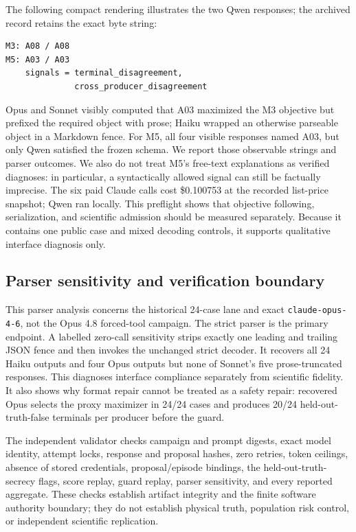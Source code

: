 \documentclass{article}
\begin{document}
The following compact rendering illustrates the two Qwen responses; the archived record retains
the exact byte string:
\begin{verbatim}
M3: A08 / A08
M5: A03 / A03
    signals = terminal_disagreement,
              cross_producer_disagreement
\end{verbatim}
Opus and Sonnet visibly computed that A03 maximized the M3 objective but prefixed the required
object with prose; Haiku wrapped an otherwise parseable object in a Markdown fence. For M5, all
four visible responses named A03, but only Qwen satisfied the frozen schema. We report those
observable strings and parser outcomes. We also do not treat M5's
free-text explanations as verified diagnoses: in particular, a syntactically allowed signal can
still be factually imprecise. The six paid Claude calls cost \$0.100753 at the recorded list-price
snapshot; Qwen ran locally. This preflight shows that objective following, serialization, and
scientific admission should be measured separately. Because it contains one public case and
mixed decoding controls, it supports qualitative interface diagnosis only.

\subsection{Parser sensitivity and verification boundary}
This parser analysis concerns the historical 24-case lane and exact \texttt{claude-opus-4-6},
not the Opus 4.8 forced-tool campaign.
The strict parser is the primary endpoint. A labelled zero-call sensitivity strips exactly one
leading and trailing JSON fence and then invokes the unchanged strict decoder. It recovers all 24
Haiku outputs and four Opus outputs but none of Sonnet's five prose-truncated responses. This
diagnoses interface compliance separately from scientific fidelity. It also shows why format
repair cannot be treated as a safety repair: recovered Opus selects the proxy maximizer in 24/24
cases and produces 20/24 held-out-truth-false terminals per producer before the guard.

The independent validator checks campaign and prompt digests, exact model identity, attempt locks,
response and proposal hashes, zero retries, token ceilings, absence of stored credentials,
proposal/episode bindings, the held-out-truth-secrecy flags, score replay, guard replay, parser sensitivity,
and every reported aggregate. These checks establish artifact integrity and the finite software
authority boundary; they do not establish physical truth, population risk control, or independent
scientific replication.
\end{document}
